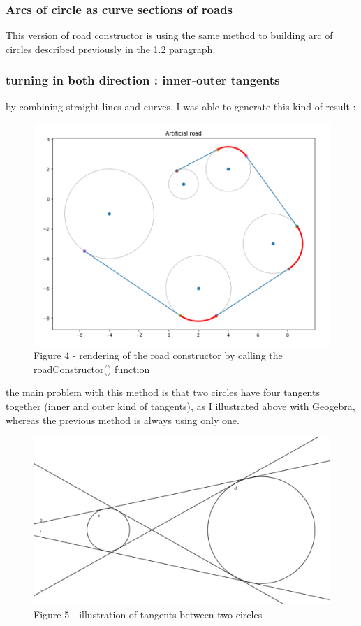 \documentclass[a4paper,12pt,fleqn]{article}
\begin{document}
\subsubsection{Arcs of circle as curve sections of roads}

This version of road constructor is using the same method to building arc of circles described previously in the 1.2 paragraph.

\subsubsection{turning in both direction : inner-outer tangents}

by combining straight lines and curves, I was able to generate this kind of result :

\begin{figure}[H]
\centering
\includegraphics[width=\textwidth]{roadConstructorPlot}
Figure 4 - rendering of the road constructor by calling the roadConstructor() function
\end{figure}

the main problem with this method is that two circles have four tangents together (inner and outer kind of tangents), as I illustrated above with Geogebra, whereas the previous method is always using only one. 

\begin{figure}[H]
\centering
\includegraphics[width=\textwidth]{tangentGeogebra}
Figure 5 - illustration of tangents between two circles
\end{figure}
\end{document}

